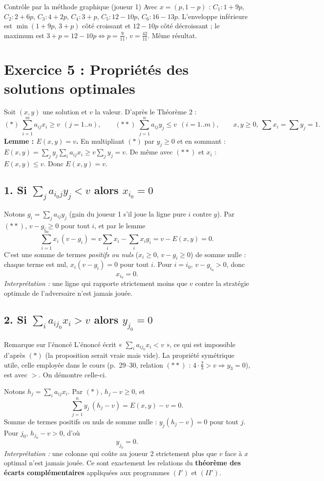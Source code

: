 \documentclass[11pt,a4paper]{article}
\begin{document}
\begin{rembox}{Contrôle par la méthode graphique (joueur 1)}
Avec $x=(p,1-p)$ : $C_1:1+9p$, $C_2:2+6p$, $C_3:4+2p$, $C_4:3+p$, $C_5:12-10p$, $C_6:16-13p$. L'enveloppe inférieure est $\min(1+9p,\,3+p)$ côté croissant et $12-10p$ côté décroissant ; le maximum est $3+p=12-10p\iff p=\frac9{11}$, $v=\frac{42}{11}$. Même résultat.
\end{rembox}

\section*{Exercice 5 : Propriétés des solutions optimales}

Soit $(x,y)$ une solution et $v$ la valeur. D'après le Théorème 2 :
\[
(\ast)\;\sum_{i=1}^m a_{ij}x_i\ge v\ \ (j=1..n),\qquad (\ast\ast)\;\sum_{j=1}^n a_{ij}y_j\le v\ \ (i=1..m),\qquad x,y\ge0,\ \sum x_i=\sum y_j=1.
\]
\textbf{Lemme : $E(x,y)=v$.} En multipliant $(\ast)$ par $y_j\ge0$ et en sommant : $E(x,y)=\sum_j y_j\sum_i a_{ij}x_i\ge v\sum_j y_j=v$. De même avec $(\ast\ast)$ et $x_i$ : $E(x,y)\le v$. Donc $E(x,y)=v$.

\subsection*{1. Si $\sum_j a_{i_0j}y_j<v$ alors $x_{i_0}=0$}
Notons $g_i=\sum_j a_{ij}y_j$ (gain du joueur 1 s'il joue la ligne pure $i$ contre $y$). Par $(\ast\ast)$, $v-g_i\ge0$ pour tout $i$, et par le lemme
\[
\sum_{i=1}^m x_i\,(v-g_i)=v\sum_i x_i-\sum_i x_ig_i=v-E(x,y)=0.
\]
C'est une somme de termes \emph{positifs ou nuls} ($x_i\ge0$, $v-g_i\ge0$) de somme nulle : chaque terme est nul, $x_i(v-g_i)=0$ pour tout $i$. Pour $i=i_0$, $v-g_{i_0}>0$, donc
\[
\boxed{x_{i_0}=0.}
\]
\emph{Interprétation :} une ligne qui rapporte strictement moins que $v$ contre la stratégie optimale de l'adversaire n'est jamais jouée.

\subsection*{2. Si $\sum_i a_{ij_0}x_i>v$ alors $y_{j_0}=0$}
\begin{rembox}{Remarque sur l'énoncé}
L'énoncé écrit « $\sum_i a_{ij_0}x_i<v$ », ce qui est impossible d'après $(\ast)$ (la proposition serait vraie mais vide). La propriété symétrique utile, celle employée dans le cours (p.~29--30, relation $(\ast\ast)$ : $4\cdot\frac23>v\Rightarrow y_3=0$), est avec $>$. On démontre celle-ci.
\end{rembox}
Notons $h_j=\sum_i a_{ij}x_i$. Par $(\ast)$, $h_j-v\ge0$, et
\[
\sum_{j=1}^n y_j\,(h_j-v)=E(x,y)-v=0.
\]
Somme de termes positifs ou nuls de somme nulle : $y_j(h_j-v)=0$ pour tout $j$. Pour $j_0$, $h_{j_0}-v>0$, d'où
\[
\boxed{y_{j_0}=0.}
\]
\emph{Interprétation :} une colonne qui coûte au joueur 2 strictement plus que $v$ face à $x$ optimal n'est jamais jouée. Ce sont exactement les relations du \textbf{théorème des écarts complémentaires} appliquées aux programmes $(I')$ et $(II')$.
\end{document}
